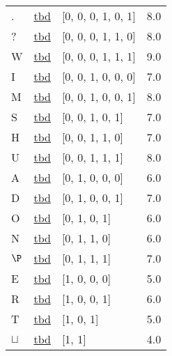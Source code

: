 \documentclass[12pt]{article}
\begin{document}
\begin{tabular}{l l l l}
.	&	\url{tbd}	&	[0, 0, 0, 1, 0, 1]	&	8.0\\
?	&	\url{tbd}	&	[0, 0, 0, 1, 1, 0]	&	8.0\\
W	&	\url{tbd}	&	[0, 0, 0, 1, 1, 1]	&	9.0\\
I	&	\url{tbd}	&	[0, 0, 1, 0, 0, 0]	&	7.0\\
M	&	\url{tbd}	&	[0, 0, 1, 0, 0, 1]	&	8.0\\
S	&	\url{tbd}	&	[0, 0, 1, 0, 1]	&	7.0\\
H	&	\url{tbd}	&	[0, 0, 1, 1, 0]	&	7.0\\
U	&	\url{tbd}	&	[0, 0, 1, 1, 1]	&	8.0\\
A	&	\url{tbd}	&	[0, 1, 0, 0, 0]	&	6.0\\
D	&	\url{tbd}	&	[0, 1, 0, 0, 1]	&	7.0\\
O	&	\url{tbd}	&	[0, 1, 0, 1]	&	6.0\\
N	&	\url{tbd}	&	[0, 1, 1, 0]	&	6.0\\
$\P$	&	\url{tbd}	&	[0, 1, 1, 1]	&	7.0\\
E	&	\url{tbd}	&	[1, 0, 0, 0]	&	5.0\\
R	&	\url{tbd}	&	[1, 0, 0, 1]	&	6.0\\
T	&	\url{tbd}	&	[1, 0, 1]	&	5.0\\
$\sqcup$	&	\url{tbd}	&	[1, 1]	&	4.0\\
\end{tabular}
\end{document}
